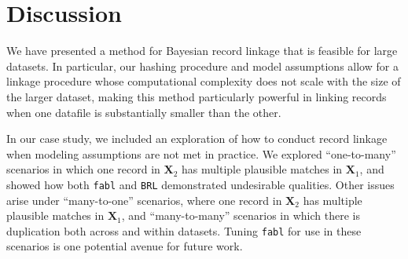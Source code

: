\documentclass[12pt,letterpaper]{article}
\newcommand{\1}[1]{\mathbb{I}\!\left[#1\right]} %
\begin{document}
\section{Discussion}
\label{discussion}

We have presented a method for Bayesian record linkage that is feasible for large datasets. In particular, our hashing procedure and model assumptions allow for a linkage procedure whose computational complexity does not scale with the size of the larger dataset, making this method particularly powerful in linking records when one datafile is
substantially smaller than the other.

In our case study, we included an exploration of how to conduct record linkage when modeling assumptions are not met in practice. We explored ``one-to-many'' scenarios in which one record in $\bm{X}_2$ has multiple plausible matches in $\bm{X}_1$, and showed how both \texttt{fabl} and \texttt{BRL} demonstrated undesirable qualities. Other issues arise under ``many-to-one'' scenarios, where one record in $\bm{X}_2$ has multiple
plausible matches in $\bm{X}_1$, and ``many-to-many'' scenarios in which there is duplication both across and within datasets. Tuning \texttt{fabl} for use in these scenarios is one potential avenue for
future work.

%	
%		
%	
\end{document}
